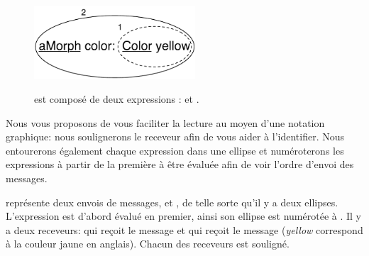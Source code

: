 \documentclass[a4paper,10pt,twoside]{book}
\begin{document}
\begin{figure}[htb]
\begin{minipage}{0.43\textwidth}
\begin{center}
		{\includegraphics[width=6cm]{uKeyUnOne}}
	\caption{ est compos\'e de deux expressions :  et .\label{fig:ellipse}}
	\end{center}
\end{minipage}
\end{figure}



Nous vous proposons de vous faciliter la lecture au moyen d'une
notation graphique: nous soulignerons le receveur afin de vous aider
\`a l'identifier. Nous entourerons \'egalement chaque expression dans
une ellipse et num\'eroterons les expressions \`a partir de la
premi\`ere \`a \^etre \'evalu\'ee afin de voir l'ordre d'envoi des messages.


 repr\'esente deux envois de messages,  et , de telle sorte qu'il y a
deux ellipses. L'expression  est d'abord \'evalu\'e
en premier, ainsi son ellipse est num\'erot\'ee \`a . Il y a
deux receveurs:  qui re\c{c}oit le message 
et  qui re\c{c}oit le message  
(\emph{yellow} correspond \`a la couleur jaune en anglais). 
Chacun des receveurs est soulign\'e.
\end{document}
